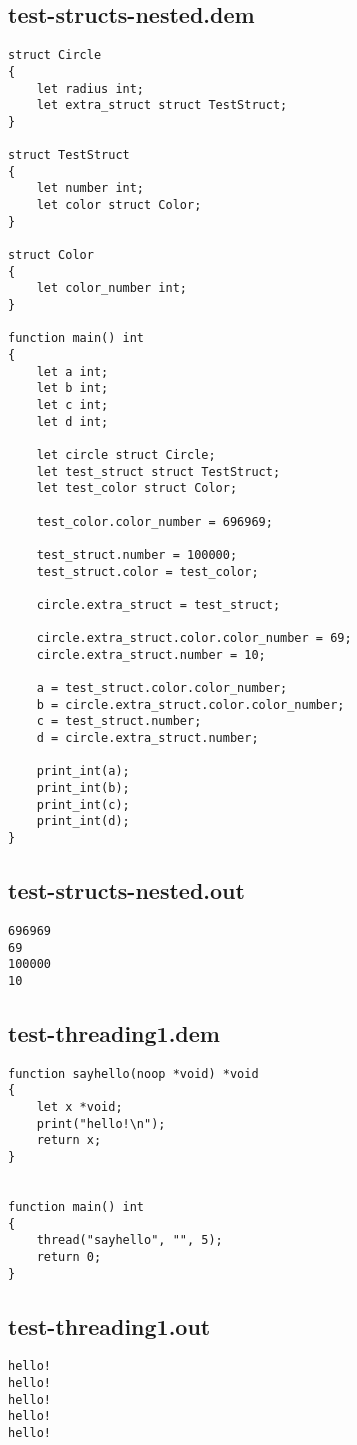 \subsection{test-structs-nested.dem}
\begin{lstlisting}
struct Circle
{
	let radius int;
	let extra_struct struct TestStruct;
}

struct TestStruct
{
	let number int;	
	let color struct Color;
}

struct Color
{
	let color_number int;
}	

function main() int
{
	let a int;
	let b int;
 	let c int;
  	let d int;
	
	let circle struct Circle;
	let test_struct struct TestStruct;
	let test_color struct Color;

	test_color.color_number = 696969;
	
	test_struct.number = 100000;
	test_struct.color = test_color;

	circle.extra_struct = test_struct;

	circle.extra_struct.color.color_number = 69;
	circle.extra_struct.number = 10;

	a = test_struct.color.color_number;
	b = circle.extra_struct.color.color_number;
	c = test_struct.number;
	d = circle.extra_struct.number;

	print_int(a);
	print_int(b);
	print_int(c);
	print_int(d);
}

\end{lstlisting}
\subsection{test-structs-nested.out}
\begin{lstlisting}
696969
69
100000
10
\end{lstlisting}
\subsection{test-threading1.dem}
\begin{lstlisting}
function sayhello(noop *void) *void
{
    let x *void;
    print("hello!\n");
    return x;
}


function main() int
{
    thread("sayhello", "", 5);
    return 0;
}
\end{lstlisting}
\subsection{test-threading1.out}
\begin{lstlisting}
hello!
hello!
hello!
hello!
hello!
\end{lstlisting}
